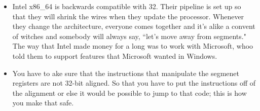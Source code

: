 \documentclass[12pt]{article}
\theoremstyle{definition}
\begin{document}
\begin{itemize}
    \item Intel x86\_64 is backwards compatible with 32. Their pipeline is set up so that they will shrink the wires when they update the processor. Whenever they change the architecture, everyone comes together and it's alike a convent of witches and somebody will always say, ``let's move away from segments." The way that Intel made money for a long was to work with Microsoft, whoo told them to support features that Microsoft wanted in Windows.
    \item You have to ake sure that the instructions that manipulate the segmenet registers are not 32-bit aligned. So that you have to put the instructions off of the alignment or else it would be possible to jump to that code; this is how you make that safe.
\end{itemize}
\end{document}
